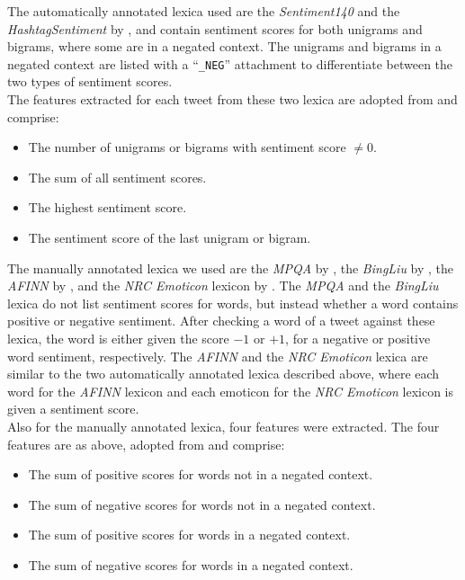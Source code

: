 The automatically annotated lexica used are the \textit{Sentiment140} and the \textit{HashtagSentiment} by \cite{MohammadKZ2013}, and contain sentiment scores for both unigrams and bigrams, where some are in a negated context. The unigrams and bigrams in a negated context are listed with a ``\texttt{\_NEG}'' attachment to differentiate between the two types of sentiment scores. \\

The features extracted for each tweet from these two lexica are adopted from \cite{MohammadKZ2013} and comprise:
\begin{itemize}
    \item The number of unigrams or bigrams with sentiment score $\neq0$.
    \item The sum of all sentiment scores.
    \item The highest sentiment score.
    \item The sentiment score of the last unigram or bigram.
\end{itemize}

The manually annotated lexica we used are the \textit{MPQA} by \cite{Wilson05}, the \textit{BingLiu} by \cite{Hu04}, the \textit{AFINN} by \cite{AFINN}, and the \textit{NRC Emoticon} lexicon by \cite{MohammadKZ2013}. The \textit{MPQA} and the \textit{BingLiu} lexica do not list sentiment scores for words, but instead whether a word contains positive or negative sentiment. After checking a word of a tweet against these lexica, the word is either given the score $-1$ or $+1$, for a negative or positive word sentiment, respectively. The \textit{AFINN} and the \textit{NRC Emoticon} lexica are similar to the two automatically annotated lexica described above, where each word for the \textit{AFINN} lexicon and each emoticon for the \textit{NRC Emoticon} lexicon is given a sentiment score. \\

Also for the manually annotated lexica, four features were extracted. The four features are as above, adopted from \cite{MohammadKZ2013} and comprise:
\begin{itemize}
    \item The sum of positive scores for words not in a negated context.
    \item The sum of negative scores for words not in a negated context.
    \item The sum of positive scores for words in a negated context.
    \item The sum of negative scores for words in a negated context.
\end{itemize}



